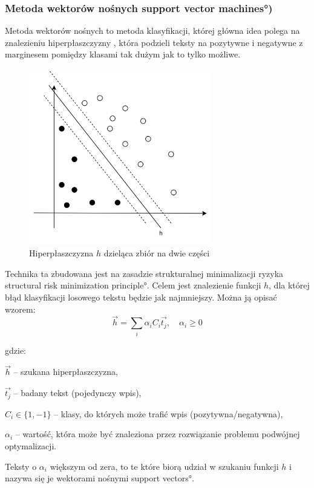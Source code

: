 \subsubsection{Metoda wektorów nośnych \ang{support vector machines})}
Metoda wektorów nośnych to metoda klasyfikacji, której główna idea polega na
znalezieniu hiperpłaszczyzny , która podzieli teksty na
pozytywne i negatywne z marginesem pomiędzy klasami tak dużym jak to tylko możliwe.


\begin{figure}[ht!]
\centering
\includegraphics[width=80mm]{img/svm.png}
\caption{Hiperpłaszczyzna $h$ dzieląca zbiór na dwie części}
\label{image:svm}
\end{figure}



Technika ta zbudowana jest na zasadzie strukturalnej minimalizacji ryzyka
\ang{structural risk minimization principle}. Celem jest znalezienie funkcji
$h$, dla której błąd klasyfikacji losowego tekstu będzie jak najmniejszy.
Można ją opisać wzorem:
\begin{equation}
\vec{h} = \sum\limits_{i}\alpha_i C_i \vec{t_j}, \quad \alpha_i \geq 0
\end{equation}

gdzie:

$\vec{h}$ -- szukana hiperpłaszczyzna,

$\vec{t_j}$ -- badany tekst (pojedynczy wpis),

$C_i \in \{1, -1\}$ -- klasy, do których może trafić wpis (pozytywna/negatywna),

$\alpha_i$ -- wartość, która może być znaleziona przez rozwiązanie problemu
podwójnej optymalizacji.

\bigskip

Teksty o $\alpha_i$ większym od zera, to te które biorą udział
w szukaniu funkcji $h$ i nazywa się je wektorami nośnymi \ang{support vectors}.

